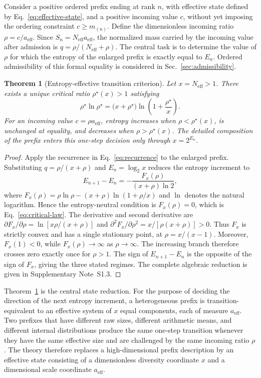 \documentclass[aip,cha,reprint,superscriptaddress,floatfix]{revtex4-2}
\newtheorem{theorem}{Theorem}
\theoremstyle{definition}
\theoremstyle{remark}
\newcommand{\Neff}{N_{\mathrm{eff}}}
\newcommand{\aeff}{a_{\mathrm{eff}}}
\newcommand{\rhostar}{\rho^{\star}}
\begin{document}
Consider a positive ordered prefix ending at rank \(n\), with effective state defined by Eq.~\eqref{eq:effective-state}, and a positive incoming value \(c\), without yet imposing the ordering constraint \(c\ge m_{(n)}\). Define the dimensionless incoming ratio \(\rho=c/\aeff\). Since \(S_n=\Neff\aeff\), the normalized mass carried by the incoming value after admission is \(q=\rho/(\Neff+\rho)\). The central task is to determine the value of \(\rho\) for which the entropy of the enlarged prefix is exactly equal to \(E_n\). Ordered admissibility of this formal equality is considered in Sec.~\ref{sec:admissibility}.

\begin{theorem}[Entropy-effective transition criterion]
\label{thm:critical}
Let \(x=\Neff>1\). There exists a unique critical ratio \(\rhostar(x)>1\) satisfying
\begin{equation}
\rhostar\ln\rhostar
=
\bigl(x+\rhostar\bigr)
\ln\!\left(1+\frac{\rhostar}{x}\right).
\label{eq:critical-law}
\end{equation}
For an incoming value \(c=\rho\aeff\), entropy increases when \(\rho<\rhostar(x)\), is unchanged at equality, and decreases when \(\rho>\rhostar(x)\). The detailed composition of the prefix enters this one-step decision only through \(x=2^{E_n}\).
\end{theorem}

\begin{proof}
Apply the recurrence in Eq.~\eqref{eq:recurrence} to the enlarged prefix. Substituting \(q=\rho/(x+\rho)\) and \(E_n=\log_2x\) reduces the entropy increment to
\[
E_{n+1}-E_n
=
-\frac{F_x(\rho)}{(x+\rho)\ln2},
\]
where \(F_x(\rho)=\rho\ln\rho-(x+\rho)\ln(1+\rho/x)\) and \(\ln\) denotes the natural logarithm. Hence the entropy-neutral condition is \(F_x(\rho)=0\), which is Eq.~\eqref{eq:critical-law}. The derivative and second derivative are \(\partial F_x/\partial\rho=\ln[x\rho/(x+\rho)]\) and \(\partial^2F_x/\partial\rho^2=x/[\rho(x+\rho)]>0\). Thus \(F_x\) is strictly convex and has a single stationary point, at \(\rho=x/(x-1)\). Moreover, \(F_x(1)<0\), while \(F_x(\rho)\to\infty\) as \(\rho\to\infty\). The increasing branch therefore crosses zero exactly once for \(\rho>1\). The sign of \(E_{n+1}-E_n\) is the opposite of the sign of \(F_x\), giving the three stated regimes. The complete algebraic reduction is given in Supplementary Note~S1.3.
\end{proof}

Theorem~\ref{thm:critical} is the central state reduction. For the purpose of deciding the direction of the next entropy increment, a heterogeneous prefix is transition-equivalent to an effective system of \(x\) equal components, each of measure \(\aeff\). Two prefixes that have different raw sizes, different arithmetic means, and different internal distributions produce the same one-step transition whenever they have the same effective size and are challenged by the same incoming ratio \(\rho\). The theory therefore replaces a high-dimensional prefix description by an effective state consisting of a dimensionless diversity coordinate \(x\) and a dimensional scale coordinate \(\aeff\).
\end{document}
